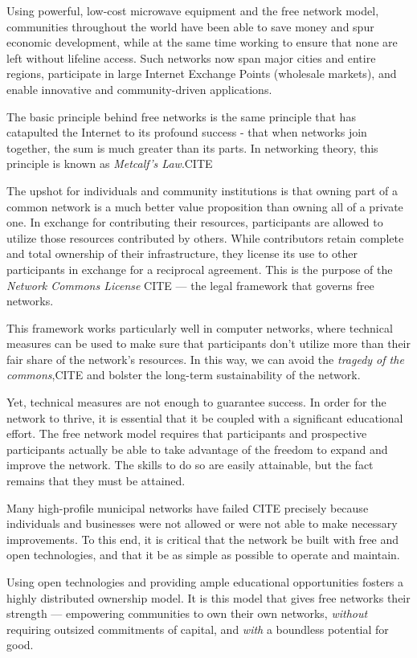 Using powerful, low-cost  microwave equipment and the free network model,
communities throughout the world have been able to save money and spur economic
development, while at the same time
working to ensure that none are left without lifeline access. Such networks now
span major cities and entire regions, participate in large Internet Exchange Points
(wholesale markets), and enable innovative and community-driven 
applications. \par
The basic principle behind free networks is the same principle that has
catapulted the Internet to its profound success - that when networks join
together, the sum is much greater than its parts. In networking theory, this
principle is known as \emph{Metcalf's Law}.CITE \par 
The upshot for individuals and community institutions is that owning part of a
common network is a much better value proposition than owning all of a private
one. In exchange for contributing their resources, participants are
allowed to utilize those resources contributed by others. While contributors
retain complete and total ownership of their infrastructure, they license its
use to other participants in exchange for a reciprocal agreement. This is the
purpose of the \emph{Network Commons License} CITE --- the legal framework that
governs free networks. \par
This framework works particularly well in computer networks, where technical
measures can be used to make sure that participants don't utilize more than
their fair share of the network's resources.
In this way, we can avoid the \emph{tragedy of the commons},CITE
and bolster the long-term sustainability of the network. \par
Yet, technical measures are not enough to guarantee success. In order for the
network to thrive, it is essential that it be coupled with a significant
educational effort. The free network model requires that participants and
prospective participants actually be able to take advantage of the freedom to
expand and improve the network. The skills to do so are easily attainable, but
the fact remains that they must be attained. \par
Many high-profile municipal networks have failed CITE precisely because individuals
and businesses were not allowed or were not able to make necessary improvements.
To this end, it is critical that the network be built with free and open
technologies, and that it be as simple as possible to operate and maintain. \par
Using open technologies and providing ample educational opportunities fosters
a highly distributed ownership model. It is this model that gives free networks
their strength --- empowering communities to own their own networks,
\emph{without} requiring outsized commitments of capital, and \emph{with} a
boundless potential for good.

